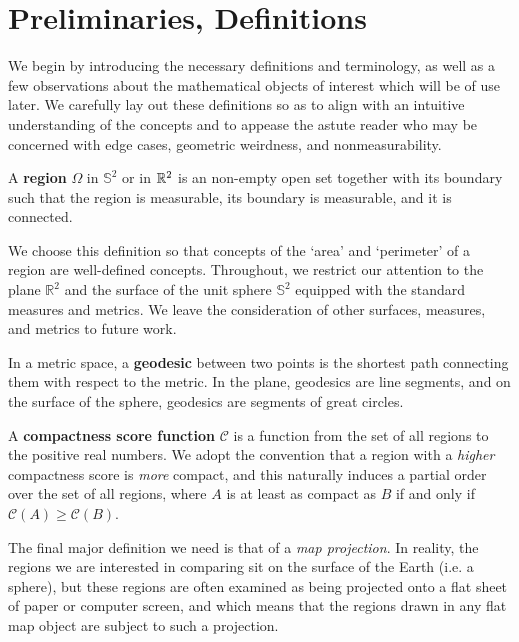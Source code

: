 \section{Preliminaries, Definitions}\label{sec:prelims}

We begin by introducing the necessary definitions and terminology, as
well as a few observations about the mathematical objects of interest
which will be of use later.  We carefully lay out these definitions so
as to align with an intuitive understanding of the concepts and to
appease the astute reader who may be concerned with edge cases,
geometric weirdness, and nonmeasurability.

\begin{definition}
  A \textbf{region} $\Omega$ in $\mathbb{S}^2$ or 
  in $\mathbb{R}^2$ is an non-empty open set together with its
  boundary such that the region is measurable, its boundary is
  measurable, and it is connected.
\end{definition}

We choose this definition so that concepts of the `area' and
`perimeter' of a region are well-defined concepts.  Throughout, we
restrict our attention to the plane $\mathbb{R}^2$ 
and the surface of the unit sphere $\mathbb{S}^2$ equipped
with the standard measures and metrics.  We leave the consideration of
other surfaces, measures, and metrics to future work.

\begin{definition}
	In a metric space, a \textbf{geodesic} between two points is the shortest path connecting them with respect to the metric.
	In the plane, geodesics are line segments, and on the surface of the sphere, geodesics are segments of great circles.
\end{definition}

\begin{definition}
  A \textbf{compactness score function} $\mathcal{C}$ is a function from
  the set of all regions to the positive real numbers.  We adopt the
  convention that a region with a \textit{higher} compactness score is
  \textit{more} compact, and this naturally induces a partial order over
  the set of all regions, where $A$ is at least as compact as $B$ if and
  only if $\mathcal{C}(A)\geq \mathcal{C}(B)$.
\end{definition}

The final major definition we need is that of a \textit{map
projection}.  In reality, the regions we are interested in comparing
sit on the surface of the Earth (i.e. a sphere), but these regions are
often examined as being projected onto a flat sheet of paper or
computer screen, and which means that the regions drawn in any flat
map object are subject to such a projection.

